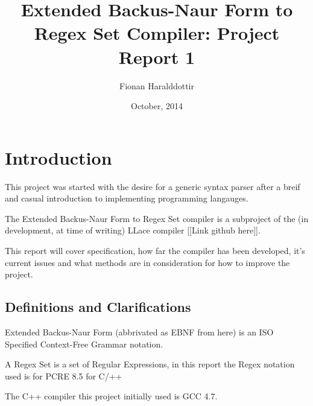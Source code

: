 \documentclass[makeidx,11pt]{article}
\title{Extended Backus-Naur Form to Regex Set Compiler: Project Report 1}
\date{October, 2014}
\author{Fionan Haralddottir}
\begin{document}
\maketitle

\pagebreak

\printindex

\pagebreak

\section*{Introduction}

This project was started with the desire for a generic syntax parser after a breif and casual introduction to implementing programming langauges.

The Extended Backus-Naur Form to Regex Set compiler is a subproject of the (in development, at time of writing) LLace compiler [[Link github here]].

This report will cover specification, how far the compiler has been developed, it's current issues and what methods are in consideration for how to improve the project.

\subsection*{Definitions and Clarifications}

Extended Backus-Naur Form (abbrivated as EBNF from here) is an ISO Specified Context-Free Grammar notation.\linebreak

A Regex Set is a set of Regular Expressions, in this report the Regex notation used is for PCRE 8.5 for C/++\linebreak

The C++ compiler this project initially used is GCC 4.7.

\pagebreak

\section{}
\end{document}
